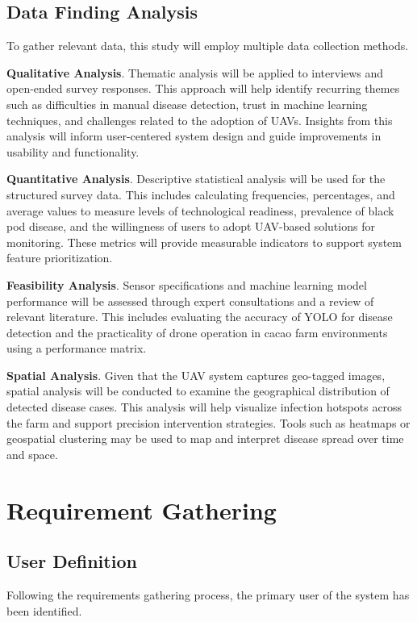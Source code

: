 \subsection{Data Finding Analysis}

To gather relevant data, this study will employ multiple data collection methods.

\textbf{Qualitative Analysis}. Thematic analysis will be applied to interviews and open-ended survey responses. This approach will help identify recurring themes such as difficulties in manual disease detection, trust in machine learning techniques, and challenges related to the adoption of UAVs. Insights from this analysis will inform user-centered system design and guide improvements in usability and functionality.

\textbf{Quantitative Analysis}. Descriptive statistical analysis will be used for the structured survey data. This includes calculating frequencies, percentages, and average values to measure levels of technological readiness, prevalence of black pod disease, and the willingness of users to adopt UAV-based solutions for monitoring. These metrics will provide measurable indicators to support system feature prioritization.


\textbf{Feasibility Analysis}. Sensor specifications and machine learning model performance will be assessed through expert consultations and a review of relevant literature. This includes evaluating the accuracy of YOLO for disease detection and the practicality of drone operation in cacao farm environments using a performance matrix.

\textbf{Spatial Analysis}. Given that the UAV system captures geo-tagged images, spatial analysis will be conducted to examine the geographical distribution of detected disease cases. This analysis will help visualize infection hotspots across the farm and support precision intervention strategies. Tools such as heatmaps or geospatial clustering may be used to map and interpret disease spread over time and space.

\section{Requirement Gathering}

\subsection{User Definition}

Following the requirements gathering process, the primary user of the system has been identified.

